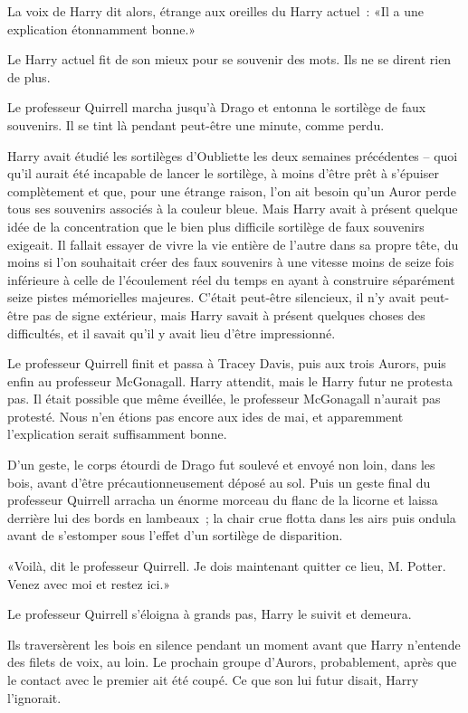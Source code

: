 La voix de Harry dit alors, étrange aux oreilles du Harry actuel~: «Il a une explication étonnamment bonne.»

Le Harry actuel fit de son mieux pour se souvenir des mots. Ils ne se dirent rien de plus.

Le professeur Quirrell marcha jusqu'à Drago et entonna le sortilège de faux souvenirs. Il se tint là pendant peut-être une minute, comme perdu.

Harry avait étudié les sortilèges d'Oubliette les deux semaines précédentes -- quoi qu'il aurait été incapable de lancer le sortilège, à moins d'être prêt à s'épuiser complètement et que, pour une étrange raison, l'on ait besoin qu'un Auror perde tous ses souvenirs associés à la couleur bleue. Mais Harry avait à présent quelque idée de la concentration que le bien plus difficile sortilège de faux souvenirs exigeait. Il fallait essayer de vivre la vie entière de l'autre dans sa propre tête, du moins si l'on souhaitait créer des faux souvenirs à une vitesse moins de seize fois inférieure à celle de l'écoulement réel du temps en ayant à construire séparément seize pistes mémorielles majeures. C'était peut-être silencieux, il n'y avait peut-être pas de signe extérieur, mais Harry savait à présent quelques choses des difficultés, et il savait qu'il y avait lieu d'être impressionné.

Le professeur Quirrell finit et passa à Tracey Davis, puis aux trois Aurors, puis enfin au professeur McGonagall. Harry attendit, mais le Harry futur ne protesta pas. Il était possible que même éveillée, le professeur McGonagall n'aurait pas protesté. Nous n'en étions pas encore aux ides de mai, et apparemment l'explication serait suffisamment bonne.

D'un geste, le corps étourdi de Drago fut soulevé et envoyé non loin, dans les bois, avant d'être précautionneusement déposé au sol. Puis un geste final du professeur Quirrell arracha un énorme morceau du flanc de la licorne et laissa derrière lui des bords en lambeaux~; la chair crue flotta dans les airs puis ondula avant de s'estomper sous l'effet d'un sortilège de disparition.

«Voilà, dit le professeur Quirrell. Je dois maintenant quitter ce lieu, M. Potter. Venez avec moi et restez ici.»

Le professeur Quirrell s'éloigna à grands pas, Harry le suivit et demeura.

Ils traversèrent les bois en silence pendant un moment avant que Harry n'entende des filets de voix, au loin. Le prochain groupe d'Aurors, probablement, après que le contact avec le premier ait été coupé. Ce que son lui futur disait, Harry l'ignorait.

